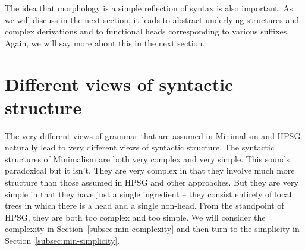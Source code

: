 \documentclass[output=paper]{langsci/langscibook}
\begin{document}
The idea that morphology is a simple reflection of syntax is also important. As we will discuss in
the next section, it leads to abstract underlying structures and complex derivations and to
functional heads corresponding to various suffixes. Again, we will say more about this in the next
section.  
	
\section{Different views of syntactic structure}
\label{sec:min-views-structure}
The very different views of grammar that are assumed in Minimalism and HPSG naturally lead to very
different views of syntactic structure. The syntactic structures of Minimalism are both very complex
and very simple. This sounds paradoxical but it isn't. They are very complex in that they involve
much more structure than those assumed in HPSG and other approaches. But they are very simple in
that they have just a single ingredient -- they consist entirely of local trees in which there is a
head and a single non-head. From the standpoint of HPSG, they are both too complex and too
simple. We will consider the complexity in Section~\ref{subsec:min-complexity} and then turn to the
simplicity in Section~\ref{subsec:min-simplicity}. 
\end{document}
